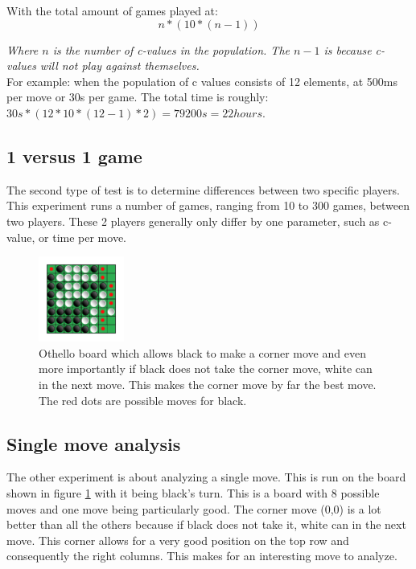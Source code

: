 \documentclass[
11pt, %
english, %
singlespacing, %
headsepline, %
]{MastersDoctoralThesis} %
\begin{document}
With the total amount of games played at: 
\[
   n * (10 * (n-1))
\]

\textit{Where $n$ is the number of c-values in the population. The $n-1$ is because c-values will not play against themselves.}\\

For example: when the population of c values consists of 12 elements, at 500ms per move or 30s per game. The total time is roughly: $30s * (12 * 10 * (12-1) * 2) =  79200s = 22 hours$.

\subsection{1 versus 1 game}
The second type of test is to determine differences between two specific players. This experiment runs a number of games, ranging from 10 to 300 games, between two players. These 2 players generally only differ by one parameter, such as c-value, or time per move.

\begin{figure}[h]
	\centering
	\includegraphics[width=0.25\textwidth]{images/corner-board}
	\caption{Othello board which allows black to make a corner move and even more importantly if black does not take the corner move, white can in the next move. This makes the corner move by far the best move. The red dots are possible moves for black.}
	\label{fig:othello-corner-board}
\end{figure}
\subsection{Single move analysis}
The other experiment is about analyzing a single move. This is run on the board shown in figure \ref{fig:othello-corner-board} with it being black's turn. This is a board with 8 possible moves and one move being particularly good. The corner move (0,0) is a lot better than all the others because if black does not take it, white can in the next move. This corner allows for a very good position on the top row and consequently the right columns. This makes for an interesting move to analyze.
\end{document}
